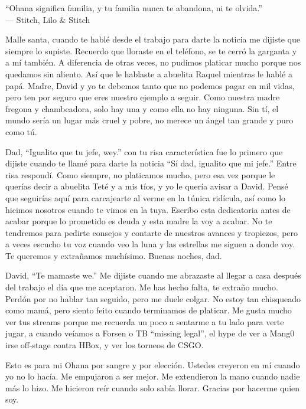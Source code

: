 \begin{frontmatter}[Dedication]
    \centering
    ``Ohana significa familia, y tu familia nunca te abandona, ni te olvida.''\\
    --- Stitch, Lilo \& Stitch

    \justify
    Malle santa, cuando te hablé desde el trabajo para darte la noticia me dijiste que siempre lo supiste. Recuerdo que lloraste en el teléfono, se te cerró la garganta y a mí también. A diferencia de otras veces, no pudimos platicar mucho porque nos quedamos sin aliento. Así que le hablaste a abuelita Raquel mientras le hablé a papá. Madre, David y yo te debemos tanto que no podemos pagar en mil vidas, pero ten por seguro que eres nuestro ejemplo a seguir. Como nuestra madre fregona y chambeadora, solo hay una y como ella no hay ninguna. Sin tí, el mundo sería un lugar más cruel y pobre, no merece un ángel tan grande y puro como tú.

    Dad, ``Igualito que tu jefe, wey.'' con tu risa característica fue lo primero que dijiste cuando te llamé para darte la noticia ``Sí dad, igualito que mi jefe.'' Entre risa respondí. Como siempre, no platicamos mucho, pero esa vez porque le querías decir a abuelita Teté y a mis tíos, y yo le quería avisar a David. Pensé que seguirías aquí para carcajearte al verme en la túnica ridícula, así como lo hicimos nosotros cuando te vimos en la tuya. Escribo esta dedicatoria antes de acabar porque lo prometido es deuda y esta madre la voy a acabar. No te tendremos para pedirte consejos y contarte de nuestros avances y tropiezos, pero a veces escucho tu voz cuando veo la luna y las estrellas me siguen a donde voy. Te queremos y extrañamos muchísimo. Buenas noches, dad.

    David, ``Te mamaste we.'' Me dijiste cuando me abrazaste al llegar a casa después del trabajo el día que me aceptaron. Me has hecho falta, te extraño mucho. Perdón por no hablar tan seguido, pero me duele colgar. No estoy tan chisqueado como mamá, pero siento feito cuando terminamos de platicar. Me gusta mucho ver tus streams porque me recuerda un poco a sentarme a tu lado para verte jugar, a cuando veíamos a Forsen o TB ``missing legal'', el hype de ver a Mang0 irse off-stage contra HBox, y ver los torneos de CSGO.

    Esto es para mi Ohana por sangre y por elección. Ustedes creyeron en mí cuando yo no lo hacía. Me empujaron a ser mejor. Me extendieron la mano cuando nadie más lo hizo. Me hicieron reír cuando solo sabía llorar. Gracias por hacerme quien soy.
\end{frontmatter}

